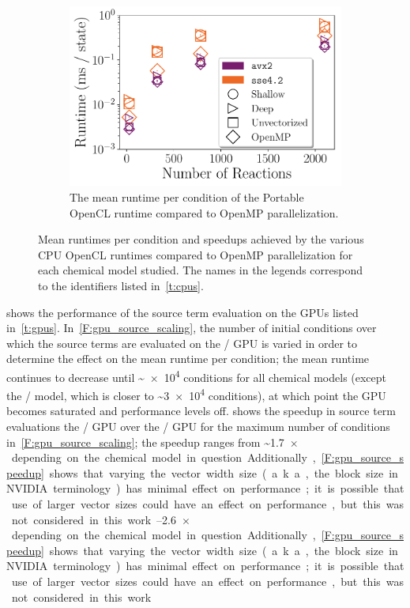 \documentclass[12pt,number,sort&compress,preprint]{elsarticle}
\begin{document}
\begin{figure}[htbp!]
\begin{subfigure}[t]{0.48\linewidth}
      \includegraphics[width=\textwidth]{pocl_source_nonorm.pdf}
      \caption{The mean runtime per condition of the Portable OpenCL runtime compared to OpenMP parallelization.}
      \label{F:pocl_source}
  \end{subfigure}
 \caption{Mean runtimes per condition and speedups achieved by the various CPU OpenCL runtimes compared to OpenMP parallelization for each chemical model studied. The names in the legends correspond to the identifiers listed in~\cref{t:cpus}.}
 \label{F:cpu_source}
\end{figure}

 shows the performance of the source term evaluation on the GPUs listed in~\cref{t:gpus}.
In~\cref{F:gpu_source_scaling}, the number of initial conditions over which the source terms are evaluated on the \gpunew/ GPU is varied in order to determine the effect on the mean runtime per condition; the mean runtime continues to decrease until \textasciitilde\num{e4} conditions for all chemical models (except the \slash{} model, which is closer to \textasciitilde\num{3e4} conditions), at which point the GPU becomes saturated and performance levels off.
 shows the speedup in source term evaluations the \gpunew/ GPU over the \gpuold/ GPU for the maximum number of conditions in~\cref{F:gpu_source_scaling}; the speedup ranges from \textasciitilde\SIrange{1.7}{2.6}{$\times$} depending on the chemical model in question.
Additionally,~\cref{F:gpu_source_speedup} shows that varying the vector width size (a.k.a., the block size in NVIDIA terminology) has minimal effect on performance; it is possible that use of larger vector sizes could have an effect on performance, but this was not considered in this work.
\end{document}
